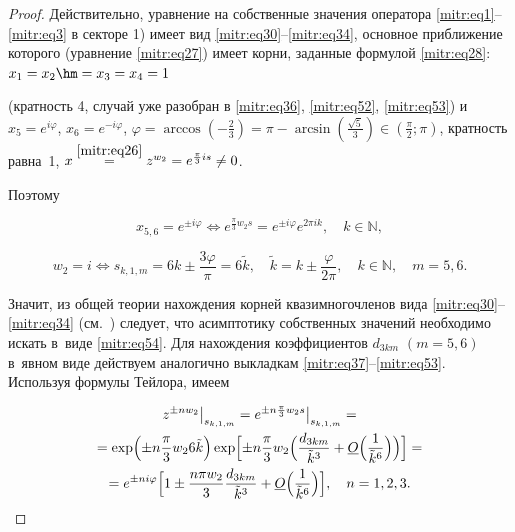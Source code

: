 \smallskip



\begin{proof} Действительно, уравнение на собственные значения оператора \eqref{mitr:eq1}--\eqref{mitr:eq3}  в секторе 1) имеет вид \eqref{mitr:eq30}--\eqref{mitr:eq34}, основное приближение которого (уравнение \eqref{mitr:eq27}) имеет  корни, заданные формулой \eqref{mitr:eq28}: $x_1=x_2\hm=x_3=x_4=1$

 (кратность 4, случай уже разобран в \eqref{mitr:eq36}, \eqref{mitr:eq52}, \eqref{mitr:eq53}) и~$x_5=e^{i\varphi}$, $x_6=e^{-i\varphi}$, $\varphi=\arccos (-\frac{2}3)=\pi-\arcsin (\frac{\sqrt5}3)\in(\frac\pi2;\pi)$, кратность равна~1, $x\stackrel{\eqref{mitr:eq26}}{=}z^{w_2}=e^{\frac\pi3 is}\ne0$.



 Поэтому 

 $$x_{5,6}=e^{\pm i\varphi} \Leftrightarrow e^{\frac\pi3 w_2s}=

e^{\pm i\varphi}e^{2\pi ik},\quad k\in\mathbb{N},$$ 

$$w_2=i \Leftrightarrow s_{k,1,m}={6k}\pm\frac{3\varphi}{\pi}=6 \tilde k,\quad \tilde k=k\pm\frac\varphi{2\pi},\quad  k\in\mathbb{N},\quad m=5,6.$$



Значит,  из общей теории нахождения корней квазимногочленов вида \eqref{mitr:eq30}--\eqref{mitr:eq34} (см.~\cite{mitr:bib11,mitr:bib13,mitr:bib20}) следует, что асимптотику собственных значений необходимо искать в~виде \eqref{mitr:eq54}. Для нахождения коэффициентов $d_{3km}$ $(m=5,6)$ в~явном виде действуем аналогично выкладкам \eqref{mitr:eq37}--\eqref{mitr:eq53}. Используя формулы Тейлора, имеем

\begin{multline}

\label{mitr:eq55}

z^{\pm nw_2}\big|_{s_{k,1,m}}=

e^{\pm n\frac\pi3 w_2s} \big|_{s_{k,1,m}} =\\=

\exp\Bigl(\pm n\frac\pi3 w_2{6\tilde k}\Bigr)

\exp\Bigl[\pm n\frac\pi3 w_2\Bigl(\frac{d_{3km}}{\tilde k^3}+\underline O

\Bigl(\frac1{\tilde k^6}\Bigr)\Bigr)\Bigr]=\\=

e^{\pm ni\varphi}\Bigl[1\pm \frac{n\pi w_2}3\frac{d_{3km}}{\tilde k^3}+

\underline O\Bigl(\frac1{\tilde k^6}\Bigr)\Bigr], \quad n=1,2,3.


\end{multline}
\end{proof}
